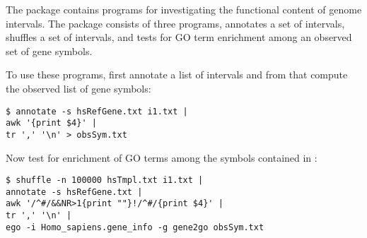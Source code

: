 The package  contains programs for investigating the
functional content of genome intervals. The package consists of three
programs,  annotates a set of intervals, 
shuffles a set of intervals, and  tests for GO term enrichment
among an observed set of gene symbols.

To use these programs, first annotate a list of intervals and from
that compute the observed list of gene symbols:
\begin{verbatim}
$ annotate -s hsRefGene.txt i1.txt | 
awk '{print $4}' | 
tr ',' '\n' > obsSym.txt
\end{verbatim}

Now test for enrichment of GO terms among the symbols contained
in :
\begin{verbatim}
$ shuffle -n 100000 hsTmpl.txt i1.txt |
annotate -s hsRefGene.txt |
awk '/^#/&&NR>1{print ""}!/^#/{print $4}' |
tr ',' '\n' |
ego -i Homo_sapiens.gene_info -g gene2go obsSym.txt
\end{verbatim}
